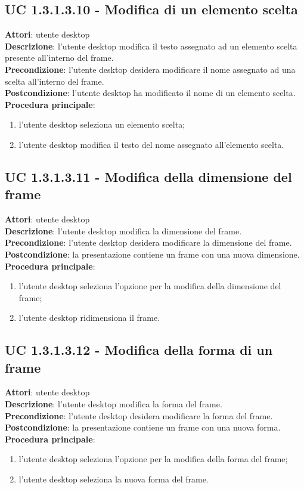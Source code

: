 \subsection{UC 1.3.1.3.10 - Modifica di un elemento scelta}{
	\label{uc1.3.1.3.10}
	\textbf{Attori}: utente desktop \\
	\textbf{Descrizione}: l'utente desktop modifica il testo assegnato ad un elemento scelta presente all'interno del frame. \\
	\textbf{Precondizione}: l'utente desktop desidera modificare il nome assegnato ad una scelta all'interno del frame.	\\
	\textbf{Postcondizione}: l'utente desktop ha modificato il nome di un elemento scelta.	\\
	\textbf{Procedura principale}:
	\begin{enumerate}
		\item l'utente desktop seleziona un elemento scelta;
		\item l'utente desktop modifica il testo del nome assegnato all'elemento scelta.
	\end{enumerate}
	}
\subsection{UC 1.3.1.3.11 - Modifica della dimensione del frame}{
	\label{uc1.3.1.3.11}
	\textbf{Attori}: utente desktop \\
	\textbf{Descrizione}: l'utente desktop modifica la dimensione del frame. \\
	\textbf{Precondizione}: l'utente desktop desidera modificare la dimensione del frame.	\\
	\textbf{Postcondizione}: la presentazione contiene un frame con una nuova dimensione.	\\
	\textbf{Procedura principale}:
	\begin{enumerate}
		\item l'utente desktop seleziona l'opzione per la modifica della dimensione del frame;
		\item l'utente desktop ridimensiona il frame.
	\end{enumerate}
	}
\subsection{UC 1.3.1.3.12 - Modifica della forma di un frame}{
	\label{uc1.3.1.3.12}
	\textbf{Attori}: utente desktop \\
	\textbf{Descrizione}: l'utente desktop modifica la forma del frame. \\
	\textbf{Precondizione}: l'utente desktop desidera modificare la forma del frame.	\\
	\textbf{Postcondizione}: la presentazione contiene un frame con una nuova forma.	\\
	\textbf{Procedura principale}:
	\begin{enumerate}
		\item l'utente desktop seleziona l'opzione per la modifica della forma del frame;
		\item l'utente desktop seleziona la nuova forma del frame.
	\end{enumerate}
	}
